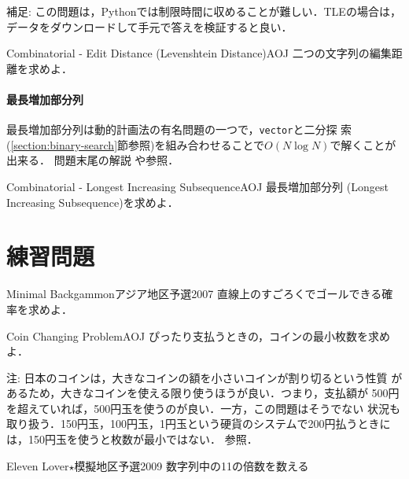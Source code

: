 補足: この問題は，Pythonでは制限時間に収めることが難しい．TLEの場合は，データをダウンロードして手元で答えを検証すると良い．

\begin{pbox}{Combinatorial - Edit Distance (Levenshtein Distance)}{AOJ}
  二つの文字列の編集距離を求めよ．
  
\end{pbox}


\paragraph{最長増加部分列}
最長増加部分列は動的計画法の有名問題の一つで，\texttt{vector}と二分探
索(\ref{section:binary-search}節参照)を組み合わせることで$O(N\log N)$で解くことが出来る．
問題末尾の解説
や\pcaojbook[pp.~421--]
参照．

\begin{pbox}{Combinatorial - Longest Increasing Subsequence}{AOJ}
  最長増加部分列 (Longest Increasing Subsequence)を求めよ．

\end{pbox}



\section{練習問題}

\begin{pbox}{Minimal Backgammon}{アジア地区予選2007}
直線上のすごろくでゴールできる確率を求めよ．
  
\end{pbox}

\begin{pbox}{Coin Changing Problem}{AOJ}
ぴったり支払うときの，コインの最小枚数を求めよ．

\end{pbox}
注: 日本のコインは，大きなコインの額を小さいコインが割り切るという性質
があるため，大きなコインを使える限り使うほうが良い．つまり，支払額が
500円を超えていれば，500円玉を使うのが良い．一方，この問題はそうでない
状況も取り扱う．150円玉，100円玉，1円玉という硬貨のシステムで200円払うときには，150円玉を使うと枚数が最小ではない．
\pcaojbook[pp.~412--]参照．

\begin{pbox}{Eleven Lover$\star$}{模擬地区予選2009}
数字列中の11の倍数を数える
  
\end{pbox}

